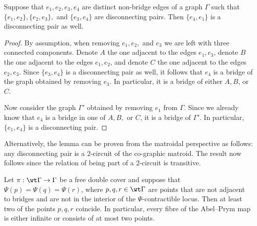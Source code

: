 \begin{lemma}\label{lem:disconnectingPairs}
    Suppose that $e_1,e_2,e_3,e_4$ are distinct non-bridge edges of a graph $\Gamma$ such that
    $\{e_1,e_2\}, \{e_2,e_3\},$ and $\{e_3,e_4\}$ are disconnecting pairs. Then $\{e_4,e_1\}$ is a disconnecting pair as well. 
\end{lemma}

\begin{proof}
By assumption, when removing $e_1,e_2,$ and $e_3$ we are left with three connected components. Denote $A$ the one adjacent to the edges $e_1,e_3$, denote $B$ the one adjacent to the edges $e_1,e_2$, and denote     $C$ the one adjacent to the edges $e_2,e_3$. 
Since $\{e_3,e_4\}$ is a disconnecting pair as well, it follows that $e_4$ is a bridge of the graph obtained by removing $e_3$. In particular, it is a bridge of either $A,B$, or $C$. 

Now consider the graph $\Gamma'$ obtained by removing $e_1$ from $\Gamma$. Since we already know that $e_4$ is a bridge in one of $A,B,$ or $C$, it is a bridge of $\Gamma'$. In particular, $\{e_1,e_4\}$ is a disconnecting pair. 
\end{proof}

Alternatively, the lemma can be proven from the matroidal perspective as follows: any disconnecting pair is a 2-circuit of the co-graphic matroid. The result now follows since the relation of being part of a 2-circuit is transitive. 

\begin{prop}
    \label{prop:fibreSize}
    Let $\pi:\wt\Gamma\to\Gamma$ be a free double cover and suppose that $\Psi(p) = \Psi(q) = \Psi(r)$, where $p,q,r\in\wt\Gamma$ are points that are not adjacent to bridges and are not in the interior of the $\Psi$-contractible locus. 
     Then at least two of the points $p,q,r$ coincide. In particular, every fibre of the Abel--Prym map is either infinite or consists of at most two points. 
\end{prop}

